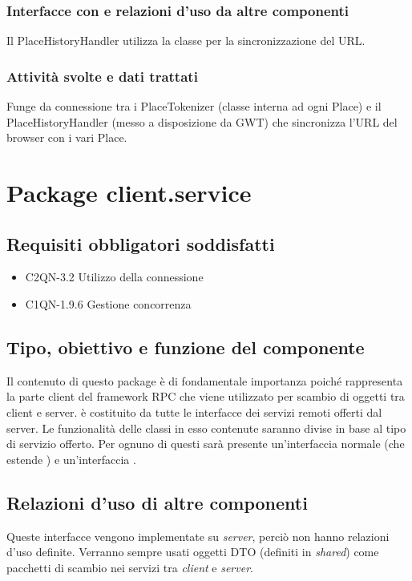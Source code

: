 \subsubsection*{Interfacce con e relazioni d'uso da altre componenti}
Il PlaceHistoryHandler utilizza la classe per la sincronizzazione del URL.
\subsubsection*{Attivit\`a svolte e dati trattati}
Funge da connessione tra i PlaceTokenizer (classe interna ad ogni Place) e il
PlaceHistoryHandler (messo a disposizione da GWT) che sincronizza l'URL del
browser con i vari Place.

\newpage
\section{Package client.service} %
\subsection*{Requisiti obbligatori soddisfatti}
\begin{itemize}
	\item C2QN-3.2 Utilizzo della connessione
	\item C1QN-1.9.6 Gestione concorrenza
\end{itemize}
\subsection*{Tipo, obiettivo e funzione del componente}
Il contenuto di questo package \`e di fondamentale importanza poich\'e
rappresenta la parte client del framework RPC che viene utilizzato per scambio
di oggetti tra client e server.  \`e costituito da tutte
le interfacce dei servizi remoti offerti dal server. Le funzionalit\`a delle
classi in esso contenute saranno divise in base al tipo di servizio offerto. Per
ognuno di questi sar\`a presente un'interfaccia normale (che estende
) e un'interfaccia .

\subsection*{Relazioni d'uso di altre componenti}
Queste interfacce vengono implementate su \emph{server}, perci\`o non
hanno relazioni d'uso definite. Verranno sempre usati oggetti DTO (definiti in
\emph{shared}) come pacchetti di scambio nei servizi tra \emph{client} e
\emph{server}.

